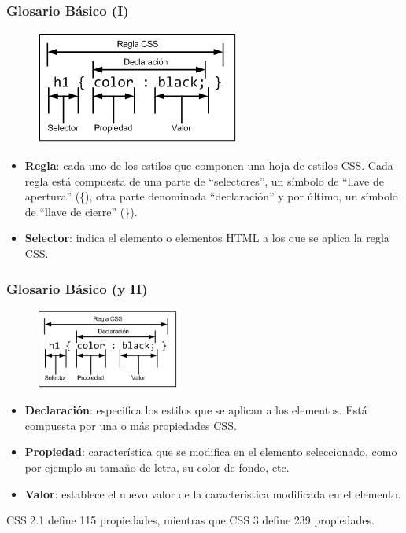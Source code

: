 \begin{frame}
\frametitle{Glosario Básico (I)}

\begin{center}
\begin{figure}[p]
\includegraphics[width=0.6\textwidth]{figs/f0101.png}
\end{figure}
\end{center}

\begin{itemize}
  \item {\bf Regla}: cada uno de los estilos que componen una hoja de estilos CSS. Cada regla está compuesta de una parte de ``selectores'', un símbolo de ``llave de apertura'' (\{), otra parte denominada ``declaración'' y por último, un símbolo de ``llave de cierre'' (\}).
  \item {\bf Selector}: indica el elemento o elementos HTML a los que se aplica la regla CSS.
\end{itemize}

\end{frame}


\begin{frame}
\frametitle{Glosario Básico (y II)}

\begin{center}
\begin{figure}[p]
\includegraphics[width=0.42\textwidth]{figs/f0101.png}
\end{figure}
\end{center}

\begin{itemize}
  \item {\bf Declaración}: especifica los estilos que se aplican a los elementos. Está compuesta por una o más propiedades CSS.
  \item {\bf Propiedad}: característica que se modifica en el elemento seleccionado, como por ejemplo su tamaño de letra, su color de fondo, etc.
  \item {\bf Valor}: establece el nuevo valor de la característica modificada en el elemento.
\end{itemize}

CSS 2.1 define 115 propiedades, mientras que CSS 3 define 239 propiedades.

\end{frame}

